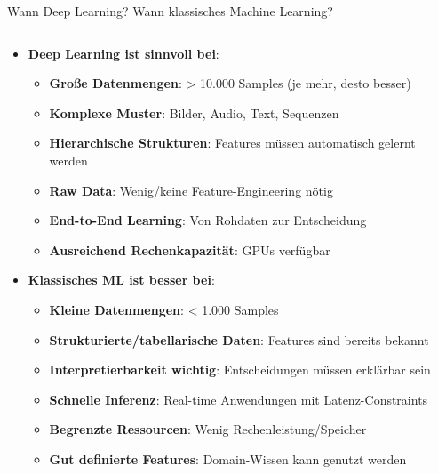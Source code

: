 \documentclass[aspectratio=1610, xcolor=dvipsnames, 9pt]{beamer}
\begin{document}
\begin{frame}{Wann Deep Learning? Wann klassisches Machine Learning?}
  \begin{columns}
    \begin{column}{1\textwidth}
      \begin{itemize}
        \item \textbf{Deep Learning ist sinnvoll bei}:
        \begin{itemize}
          \item \textbf{Große Datenmengen}: > 10.000 Samples (je mehr, desto besser)
          \item \textbf{Komplexe Muster}: Bilder, Audio, Text, Sequenzen
          \item \textbf{Hierarchische Strukturen}: Features müssen automatisch gelernt werden
          \item \textbf{Raw Data}: Wenig/keine Feature-Engineering nötig
          \item \textbf{End-to-End Learning}: Von Rohdaten zur Entscheidung
          \item \textbf{Ausreichend Rechenkapazität}: GPUs verfügbar
        \end{itemize}
        \item \textbf{Klassisches ML ist besser bei}:
        \begin{itemize}
          \item \textbf{Kleine Datenmengen}: < 1.000 Samples
          \item \textbf{Strukturierte/tabellarische Daten}: Features sind bereits bekannt
          \item \textbf{Interpretierbarkeit wichtig}: Entscheidungen müssen erklärbar sein
          \item \textbf{Schnelle Inferenz}: Real-time Anwendungen mit Latenz-Constraints
          \item \textbf{Begrenzte Ressourcen}: Wenig Rechenleistung/Speicher
          \item \textbf{Gut definierte Features}: Domain-Wissen kann genutzt werden
        \end{itemize}
      \end{itemize}
    \end{column}
  \end{columns}
\end{frame}
\end{document}
